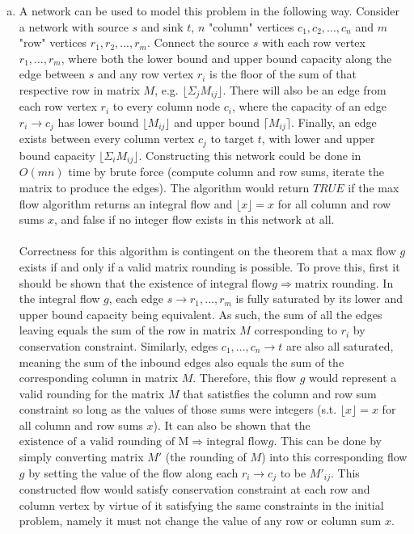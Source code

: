 \documentclass[11pt]{article}
\begin{document}



\begin{enumerate}[(a)]
    \item
    \begin{solution}
    A network can be used to model this problem in the following way. Consider a network with source $s$ and sink $t$, $n$ "column" vertices $c_1,c_2,...,c_n$ and $m$ "row" vertices $r_1,r_2,...,r_m$. Connect the source $s$ with each row vertex $r_1,...,r_m$, where both the lower bound and upper bound capacity along the edge between $s$ and any row vertex $r_i$ is the floor of the sum of that respective row in matrix $M$, e.g. $\lfloor \Sigma_{j} M_{ij} \rfloor$. There will also be an edge from each row vertex $r_i$ to every column node $c_i$, where the capacity of an edge $r_i \to c_j$ has lower bound $\lfloor M_{ij} \rfloor$ and upper bound $\lceil M_{ij} \rceil$. Finally, an edge exists between every column vertex $c_j$ to target $t$, with lower and upper bound capacity $\lfloor \Sigma_{i} M_{ij} \rfloor$. Constructing this network could be done in $O(mn)$ time by brute force (compute column and row sums, iterate the matrix to produce the edges). The algorithm would return $TRUE$ if the max flow algorithm returns an integral flow and $\lfloor x \rfloor = x$ for all column and row sums $x$, and false if no integer flow exists in this network at all. \\ \\
    Correctness for this algorithm is contingent on the theorem that a max flow $g$ exists if and only if a valid matrix rounding is possible. To prove this, first it should be shown that the $\text{existence of integral flow} g \Rightarrow \text{matrix rounding}$. In the integral flow $g$, each edge $s \to r_1,...,r_m$ is fully saturated by its lower and upper bound capacity being equivalent. As such, the sum of all the edges leaving equals the sum of the row in matrix $M$ corresponding to $r_i$ by conservation constraint. Similarly, edges $c_1,...,c_n \to t$ are also all saturated, meaning the sum of the inbound edges also equals the sum of the corresponding column in matrix $M$. Therefore, this flow $g$ would represent a valid rounding for the matrix $M$  that satistfies the column and row sum constraint so long as the values of those sums were integers (s.t. $\lfloor x \rfloor = x$ for all column and row sums $x$). It can also be shown that the $\text{existence of a valid rounding of M} \Rightarrow \text{integral flow} g$. This can be done by simply converting matrix $M'$ (the rounding of $M$) into this corresponding flow $g$ by setting the value of the flow along each $r_i \to c_j$ to be $M'_{ij}$. This constructed flow would satisfy conservation constraint at each row and column vertex by virtue of it satisfying the same constraints in the initial problem, namely it must not change the value of any row or column sum $x$. \\ \\

\end{solution}
\end{enumerate}
\end{document}

